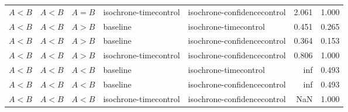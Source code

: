 \begin{tabular}{lllllrr}
   $A<B$ & $A<B$ &    $A=B$ & isochrone-timecontrol & isochrone-confidencecontrol &      2.061 &   1.000 \\
   $A<B$ & $A<B$ &    $A>B$ &              baseline &       isochrone-timecontrol &      0.451 &   0.265 \\
   $A<B$ & $A<B$ &    $A>B$ &              baseline & isochrone-confidencecontrol &      0.364 &   0.153 \\
   $A<B$ & $A<B$ &    $A>B$ & isochrone-timecontrol & isochrone-confidencecontrol &      0.806 &   1.000 \\
   $A<B$ & $A<B$ &    $A<B$ &              baseline &       isochrone-timecontrol &        inf &   0.493 \\
   $A<B$ & $A<B$ &    $A<B$ &              baseline & isochrone-confidencecontrol &        inf &   0.493 \\
   $A<B$ & $A<B$ &    $A<B$ & isochrone-timecontrol & isochrone-confidencecontrol &        NaN &   1.000 \\
\bottomrule
\end{tabular}
